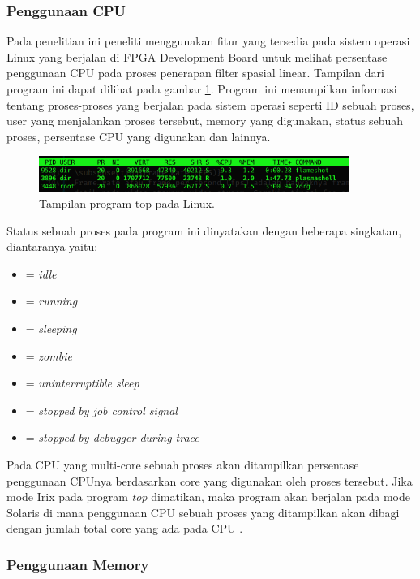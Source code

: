 \subsubsection{Penggunaan CPU}
Pada penelitian ini peneliti menggunakan fitur yang tersedia pada sistem operasi Linux yang berjalan di FPGA Development Board untuk melihat persentase penggunaan CPU pada proses penerapan filter spasial linear. Tampilan dari program ini dapat dilihat pada gambar \ref{fig:top}. Program ini menampilkan informasi tentang proses-proses yang berjalan pada sistem operasi seperti ID sebuah proses, user yang menjalankan proses tersebut, memory yang digunakan, status sebuah proses, persentase CPU yang digunakan dan lainnya.
\begin{figure}[H]
    \includegraphics[width=0.9\textwidth, center]{images/programs/top.png}
    \caption{Tampilan program top pada Linux.}
    \label{fig:top}
\end{figure}
Status sebuah proses pada program ini dinyatakan dengan beberapa singkatan, diantaranya yaitu:
\begin{itemize}[noitemsep, topsep=0pt]
    \item[]{ = \textit{idle}}
    \item[]{ = \textit{running}}
    \item[]{ = \textit{sleeping}}
    \item[]{ = \textit{zombie}}
    \item[]{ = \textit{uninterruptible sleep}}
    \item[]{ = \textit{stopped by job control signal}}
    \item[]{ = \textit{stopped by debugger during trace}}
  \end{itemize}

Pada CPU yang multi-core sebuah proses akan ditampilkan persentase penggunaan CPUnya berdasarkan core yang digunakan oleh proses tersebut. Jika mode Irix pada program \textit{top} dimatikan, maka program akan berjalan pada mode Solaris di mana penggunaan CPU sebuah proses yang ditampilkan akan dibagi dengan jumlah total core yang ada pada CPU \cite{manual:linux}.

\subsubsection{Penggunaan Memory}


